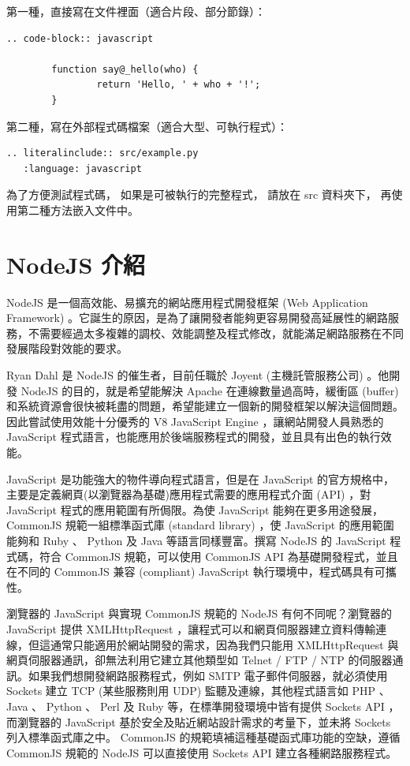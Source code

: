 \documentclass[a4paper,12pt,english]{sphinxmanual}
\begin{document}
第一種，直接寫在文件裡面（適合片段、部分節錄）：

\begin{Verbatim}[commandchars=@\[\]]
.. code-block:: javascript

        function say@_hello(who) {
                return 'Hello, ' + who + '!';
        }
\end{Verbatim}

第二種，寫在外部程式碼檔案（適合大型、可執行程式）：

\begin{Verbatim}[commandchars=@\[\]]
.. literalinclude:: src/example.py
   :language: javascript
\end{Verbatim}

為了方便測試程式碼，
如果是可被執行的完整程式，
請放在 src 資料夾下，
再使用第二種方法嵌入文件中。


\chapter{NodeJS 介紹}
\label{nodejs_intro::doc}\label{nodejs_intro:nodejs}
NodeJS 是一個高效能、易擴充的網站應用程式開發框架 (Web Application Framework) 。它誕生的原因，是為了讓開發者能夠更容易開發高延展性的網路服務，不需要經過太多複雜的調校、效能調整及程式修改，就能滿足網路服務在不同發展階段對效能的要求。

Ryan Dahl 是 NodeJS 的催生者，目前任職於 Joyent (主機託管服務公司) 。他開發 NodeJS 的目的，就是希望能解決 Apache 在連線數量過高時，緩衝區 (buffer) 和系統資源會很快被耗盡的問題，希望能建立一個新的開發框架以解決這個問題。因此嘗試使用效能十分優秀的 V8 JavaScript Engine ，讓網站開發人員熟悉的 JavaScript 程式語言，也能應用於後端服務程式的開發，並且具有出色的執行效能。

JavaScript 是功能強大的物件導向程式語言，但是在 JavaScript 的官方規格中，主要是定義網頁(以瀏覽器為基礎)應用程式需要的應用程式介面 (API) ，對 JavaScript 程式的應用範圍有所侷限。為使 JavaScript 能夠在更多用途發展， CommonJS 規範一組標準函式庫 (standard library) ，使 JavaScript 的應用範圍能夠和 Ruby 、 Python 及 Java 等語言同樣豐富。撰寫 NodeJS 的 JavaScript 程式碼，符合 CommonJS 規範，可以使用 CommonJS API 為基礎開發程式，並且在不同的 CommonJS 兼容 (compliant) JavaScript 執行環境中，程式碼具有可攜性。

瀏覽器的 JavaScript 與實現 CommonJS 規範的 NodeJS 有何不同呢？瀏覽器的 JavaScript 提供 XMLHttpRequest ，讓程式可以和網頁伺服器建立資料傳輸連線，但這通常只能適用於網站開發的需求，因為我們只能用 XMLHttpRequest 與網頁伺服器通訊，卻無法利用它建立其他類型如 Telnet / FTP / NTP 的伺服器通訊。如果我們想開發網路服務程式，例如 SMTP 電子郵件伺服器，就必須使用 Sockets 建立 TCP (某些服務則用 UDP) 監聽及連線，其他程式語言如 PHP 、 Java 、 Python 、 Perl 及 Ruby 等，在標準開發環境中皆有提供 Sockets API ，而瀏覽器的 JavaScript 基於安全及貼近網站設計需求的考量下，並未將 Sockets 列入標準函式庫之中。 CommonJS 的規範填補這種基礎函式庫功能的空缺，遵循 CommonJS 規範的 NodeJS 可以直接使用 Sockets API 建立各種網路服務程式。
\end{document}
